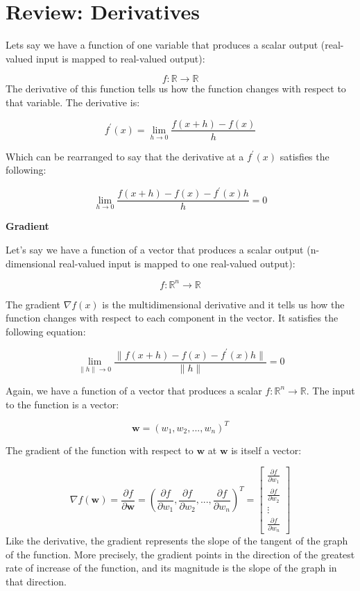 \documentclass[
]{book}
\begin{document}
\hypertarget{review-derivatives}{%
\section{Review: Derivatives}\label{review-derivatives}}

Lets say we have a function of one variable that produces a scalar
output (real-valued input is mapped to real-valued output):

\[
f:
\mathbb{R} 
\rightarrow 
\mathbb{R}
\] The derivative of this function tells us how the function changes
with respect to that variable. The derivative is:

\[
f^{\prime}(x) = 
\lim_{h\to 0} 
\frac{f(x + h) - f(x)}{h}
\]

Which can be rearranged to say that the derivative at a \(f^{\prime}(x)\)
satisfies the following:

\[
\lim_{h\to 0} 
\frac{f(x + h) - f(x) - f^{\prime}(x)h}
{h} 
= 0
\]

\textbf{Gradient}

Let's say we have a function of a vector that produces a scalar output
(n-dimensional real-valued input is mapped to one real-valued output):

\[
f:
\mathbb{R}^{n} 
\rightarrow 
\mathbb{R}
\]

The gradient \(\nabla f(x)\) is the multidimensional derivative and it
tells us how the function changes with respect to each component in the
vector. It satisfies the following equation:

\[
\lim_{\| h \|\to 0} 
\frac{\|f(x + h) - f(x) - f^{\prime}(x)h\|}
{\| h \|}
= 0
\]

Again, we have a function of a vector that produces a scalar
\(f:\mathbb{R}^{n} \rightarrow\mathbb{R}\). The input to the function is a
vector:

\[\mathbf{w} = (w_1, w_2, ..., w_n)^T\]

The gradient of the function with respect to \(\mathbf{w}\) at
\(\mathbf{w}\) is itself a vector:

\[
\nabla f(\mathbf{w}) =
\frac{\partial{f}}{\partial{\mathbf{w}}} =
(
\frac{\partial{f}}{\partial{w_1}},
\frac{\partial{f}}{\partial{w_2}}, ...,
\frac{\partial{f}}{\partial{w_n}}
)^T =
\begin{bmatrix}
  \frac{\partial{f}}{\partial{w_1}} \\
  \frac{\partial{f}}{\partial{w_2}} \\
  \vdots \\
  \frac{\partial{f}}{\partial{w_n}}
 \end{bmatrix}
\] Like the derivative, the gradient represents the slope of the tangent
of the graph of the function. More precisely, the gradient points in the
direction of the greatest rate of increase of the function, and its
magnitude is the slope of the graph in that direction.
\end{document}
